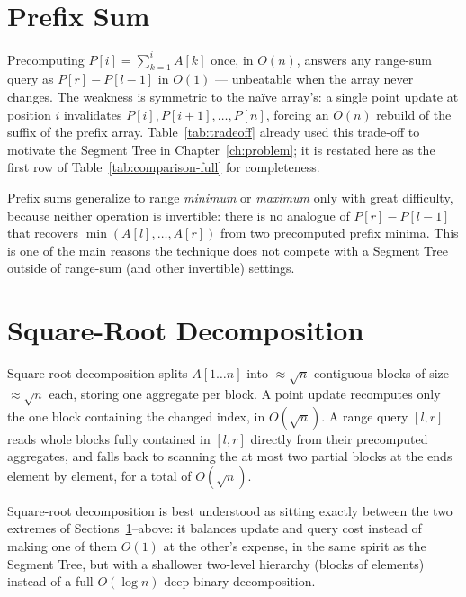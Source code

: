 \documentclass[
  11pt,
  a4paper,
  twoside=false,
  numbers=noenddot,
  headings=big,
  parskip=half,
  toc=bibliography,
  toc=listof,
  bibliography=totoc
]{scrreprt}
\newcommand{\Oh}[1]{O\!\left(#1\right)}
\begin{document}
\section{Prefix Sum}
\label{sec:prefixsum}
Precomputing $P[i]=\sum_{k=1}^{i}A[k]$ once, in $\Oh{n}$, answers any range-sum query as $P[r]-P[l-1]$ in $\Oh{1}$ --- unbeatable when the array never changes. The weakness is symmetric to the na\"ive array's: a single point update at position $i$ invalidates $P[i],P[i+1],\ldots,P[n]$, forcing an $\Oh{n}$ rebuild of the suffix of the prefix array. Table~\ref{tab:tradeoff} already used this trade-off to motivate the Segment Tree in Chapter~\ref{ch:problem}; it is restated here as the first row of Table~\ref{tab:comparison-full} for completeness.

\begin{pitfall}
Prefix sums generalize to range \emph{minimum} or \emph{maximum} only with great difficulty, because neither operation is invertible: there is no analogue of $P[r]-P[l-1]$ that recovers $\min(A[l],\ldots,A[r])$ from two precomputed prefix minima. This is one of the main reasons the technique does not compete with a Segment Tree outside of range-sum (and other invertible) settings.
\end{pitfall}

\section{Square-Root Decomposition}
\label{sec:sqrtdecomp}
Square-root decomposition splits $A[1\ldots n]$ into $\approx\sqrt{n}$ contiguous blocks of size $\approx\sqrt{n}$ each, storing one aggregate per block. A point update recomputes only the one block containing the changed index, in $\Oh{\sqrt n}$. A range query $[l,r]$ reads whole blocks fully contained in $[l,r]$ directly from their precomputed aggregates, and falls back to scanning the at most two partial blocks at the ends element by element, for a total of $\Oh{\sqrt n}$.

\begin{keyidea}
Square-root decomposition is best understood as sitting exactly between the two extremes of Sections~\ref{sec:prefixsum}--above: it balances update and query cost instead of making one of them $\Oh{1}$ at the other's expense, in the same spirit as the Segment Tree, but with a shallower two-level hierarchy (blocks of elements) instead of a full $\Oh{\log n}$-deep binary decomposition.
\end{keyidea}
\end{document}
